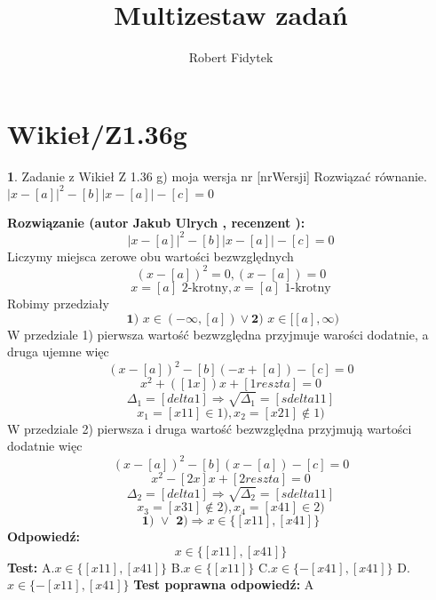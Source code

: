 \documentclass[12pt, a4paper]{article}
\title{Multizestaw zadań}
\author{Robert Fidytek}
\date{}
\theoremstyle{definition} %
\newtheorem{zad}{}
\newcommand{\kategoria}[1]{\section{#1}} %
\newcommand{\zadStart}[1]{\begin{zad}#1\newline} %
\newcommand{\zadStop}{\end{zad}}   %
\newcommand{\rozwStart}[2]{\noindent \textbf{Rozwiązanie (autor #1 , recenzent #2): }\newline} %
\newcommand{\rozwStop}{\newline}                                            %
\newcommand{\odpStart}{\noindent \textbf{Odpowiedź:}\newline}    %
\newcommand{\odpStop}{\newline}                                             %
\newcommand{\testStart}{\noindent \textbf{Test:}\newline} %
\newcommand{\testStop}{\newline} %
\newcommand{\kluczStart}{\noindent \textbf{Test poprawna odpowiedź:}\newline} %
\newcommand{\kluczStop}{\newline} %
\begin{document}
\maketitle


\kategoria{Wikieł/Z1.36g}
\zadStart{Zadanie z Wikieł Z 1.36 g) moja wersja nr [nrWersji]}
Rozwiązać równanie. $|x-[a]|^{2}-[b]|x-[a]|-[c]=0$
\zadStop
\rozwStart{Jakub Ulrych}{}
$$|x-[a]|^{2}-[b]|x-[a]|-[c]=0$$
Liczymy miejsca zerowe obu wartości bezwzględnych
$$(x-[a])^{2}=0,(x-[a])=0$$
$$x=[a]\text{ 2-krotny},x=[a]\text{ 1-krotny}$$
Robimy przedziały
$$\textbf{ 1) }x\in(-\infty,[a])\vee\textbf{2) }x\in[[a],\infty)$$
W przedziale 1) pierwsza wartość bezwzględna przyjmuje warości dodatnie, a druga ujemne więc
$$(x-[a])^{2}-[b](-x+[a])-[c]=0$$
$$x^{2}+([1x])x+[1reszta]=0$$
$$\Delta_{1}=[delta1]\Rightarrow\sqrt{\Delta_{1}}=[sdelta11]$$
$$x_{1}=[x11]\in1),x_{2}=[x21]\notin1)$$
W przedziale 2) pierwsza i druga wartość bezwzględna przyjmują wartości dodatnie więc
$$(x-[a])^{2}-[b](x-[a])-[c]=0$$
$$x^{2}-[2x]x+[2reszta]=0$$
$$\Delta_{2}=[delta1]\Rightarrow\sqrt{\Delta_{2}}=[sdelta11]$$
$$x_{3}=[x31]\notin2),x_{4}=[x41]\in2)$$
$$\textbf{1) }\vee\textbf{ 2)}\Rightarrow x\in\{[x11],[x41]\}$$
\rozwStop
\odpStart
$$x\in\{[x11],[x41]\}$$
\odpStop
\testStart
A.$x\in\{[x11],[x41]\}$
B.$x\in\{[x11]\}$
C.$x\in\{-[x41],[x41]\}$
D.$x\in\{-[x11],[x41]\}$
\testStop
\kluczStart
A
\kluczStop
\end{document}
